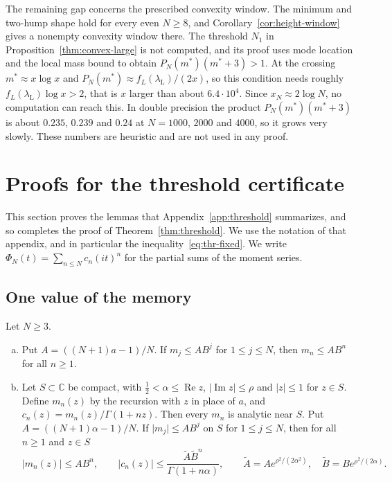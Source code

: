 \begin{remark}\label{rem:convex-open}
The remaining gap concerns the prescribed convexity window.
The minimum and two-hump shape hold for every even $N\ge8$,
and Corollary~\ref{cor:height-window} gives a nonempty convexity
window there. The threshold $N_1$ in Proposition~\ref{thm:convex-large}
is not computed, and its proof uses mode location and the local
mass bound to obtain $P_N(m^*)(m^*+3)>1$. At the crossing
$m^*\approx x\log x$ and $P_N(m^*)\approx f_L(\lambda_{\mathrm L})/(2x)$, so
this condition needs roughly $f_L(\lambda_{\mathrm L})\log x>2$, that is $x$
larger than about $6.4\cdot10^4$. Since $x_N\approx2\log N$, no computation
can reach this. In double precision the product $P_N(m^*)(m^*+3)$ is
about $0.235$, $0.239$ and $0.24$ at $N=1000$, $2000$ and $4000$, so it
grows very slowly. These numbers are heuristic and are not used in any proof.
\end{remark}

\clearpage
\section{Proofs for the threshold certificate}\label{or:threshold}

This section proves the lemmas that Appendix~\ref{app:threshold} summarizes,
and so completes the proof of Theorem~\ref{thm:threshold}. We use the notation
of that appendix, and in particular the inequality~\eqref{eq:thr-fixed}. We
write $\Phi_N(t)=\sum_{n\le N}c_n(it)^n$ for the partial sums of the moment
series.

\subsection{One value of the memory}

\begin{lemma}\label{lem:thr-moments}
Let $N\ge3$.
\begin{enumerate}[(a)]
\item Put $A=((N+1)a-1)/N$. If $m_j\le AB^j$ for $1\le j\le N$, then
$m_n\le AB^n$ for all $n\ge1$.
\item Let $S\subset\mathbb C$ be compact, with $\frac12<\alpha\le\operatorname{Re}z$,
$\lvert\operatorname{Im}z\rvert\le\rho$ and $\lvert z\rvert\le1$ for $z\in S$.
Define $m_n(z)$ by the recursion with $z$ in place of $a$, and
$c_n(z)=m_n(z)/\Gamma(1+nz)$. Then every $m_n$ is analytic near $S$. Put
$A=((N+1)\alpha-1)/N$. If $\lvert m_j\rvert\le AB^j$ on $S$ for $1\le j\le N$,
then for all $n\ge1$ and $z\in S$
\[
 \lvert m_n(z)\rvert\le AB^n,\qquad
 \lvert c_n(z)\rvert\le\frac{\tilde A\tilde B^n}{\Gamma(1+n\alpha)},\qquad
 \tilde A=Ae^{\rho^2/(2\alpha^2)},\quad \tilde B=Be^{\rho^2/(2\alpha)} .
\]
\end{enumerate}
\end{lemma}

